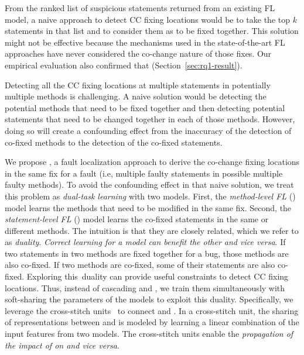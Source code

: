 From the ranked list of suspicious statements returned from an
existing FL model, a naive approach to detect CC fixing locations would
be to take the top $k$ statements in that list and to consider them as
to be fixed together. This solution might not be effective
because the mechanisms used in the state-of-the-art FL approaches have
never considered the co-change nature of those fixes. Our empirical
evaluation also confirmed that (Section~\ref{sec:rq1-result}).

Detecting all the CC fixing locations at multiple statements in
potentially multiple methods is challenging. A naive solution would be
detecting the potential methods that need to be fixed together and
then detecting potential statements that need to be changed together
in each of those methods. However, doing so will create a confounding
effect from the inaccuracy of the detection of co-fixed methods to the
detection of the co-fixed statements.

We propose {\tool}, a fault localization approach to derive the
co-change fixing locations in the same fix for a fault (i.e, multiple
faulty statements in possible multiple faulty methods).
To avoid the confounding effect in that naive solution, we treat this
problem as {\em dual-task learning} with two models. First, the {\em
  method-level FL} () model learns the methods that need
to be modified in the same fix. Second, the {\em statement-level FL}
() model learns the co-fixed statements in the same or
different methods. The intuition is that they are closely related,
which we refer to as {\em duality}. {\em Correct learning for a model
  can benefit the other and vice versa}. If two statements in two
methods are fixed together for a bug, those methods are also
co-fixed. If two methods are co-fixed, some of their statements are
also co-fixed. Exploring this~duality can provide useful constraints
to detect CC fixing locations. Thus, instead of
cascading  and , we train them
simultaneously with soft-sharing the parameters of the models to
exploit this duality. Specifically, we leverage the cross-stitch
units~\cite{misra2016cross} to connect  and
. In a cross-stitch unit, the sharing of representations
between  and  is modeled by learning a
linear combination of the input features from two models. The
cross-stitch units enable the {\em propagation of the impact of
   on  and vice versa}.

